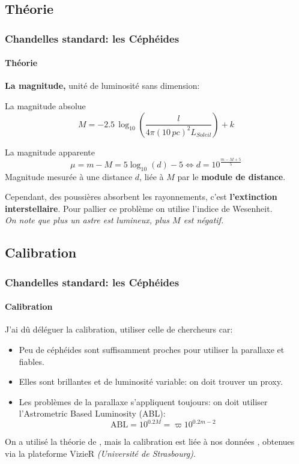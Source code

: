 \documentclass[10pt,compress,hyperref={pdfpagemode=FullScreen,colorlinks=false}]{beamer}
\begin{document}
\subsection{Théorie}
\begin{frame}
    \frametitle{Chandelles standard: les Céphéides}
    \framesubtitle{Théorie}
    \textbf{La magnitude,} unité de luminosité sans dimension:
    \begin{block}{La magnitude absolue}
        \begin{equation*}
            M=-2.5\,\log_{10}(\frac{l}{4\pi(10\,pc)^2L_{Soleil}})+k
        \end{equation*}
    \end{block}

    \begin{block}{La magnitude apparente}
        \begin{equation*}\label{eq.module_distance}
            \mu = m-M = 5\log_{10}(d)-5 
            \Longleftrightarrow d = 10^{\frac{m-M+5}{5}}
        \end{equation*}
        Magnitude mesurée à une distance $d$, liée à $M$ par le \textbf{module de distance}.
    \end{block}
    Cependant, des poussières absorbent les rayonnements, c'est \textbf{l'extinction interstellaire}.
    Pour pallier ce problème on utilise l'indice de Wesenheit.
    \\[8pt]
    \textit{On note que plus un astre est lumineux, plus $M$ est négatif.}
\end{frame}

\subsection{Calibration}
\begin{frame}
    \frametitle{Chandelles standard: les Céphéides}
    \framesubtitle{Calibration}
    J'ai dû déléguer la calibration, utiliser celle de chercheurs car:
    \begin{itemize}
        \item Peu de céphéides sont suffisamment proches pour utiliser la parallaxe et fiables.
        \item Elles sont brillantes et de luminosité variable: on doit trouver un proxy.
        \item Les problèmes de la parallaxe s'appliquent toujours: on doit utiliser l'Astrometric Based Luminosity (ABL):
         \begin{equation*}\label{eq.ABL}
            \text{ABL} = 10^{0.2 M} = \varpi 10^{0.2 m - 2}
         \end{equation*}
    \end{itemize}
    On a utilisé la théorie de \citet{cepheid-calibration}, mais la calibration est liée à nos données \citet{Ripepi_datapaper},
    obtenues via la plateforme VizieR \textit{(Université de Strasbourg)}.
\end{frame}
\end{document}
